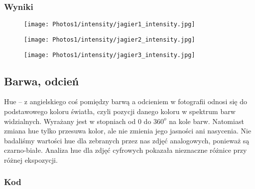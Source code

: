 \documentclass[]{mwart}
\begin{document}
\subsubsection{Wyniki}



\begin{figure}[H]
    \centering
    \texttt{[image: Photos1/intensity/jagier1\_intensity.jpg]}
\end{figure}
\begin{figure}[H]
    \centering
    \texttt{[image: Photos1/intensity/jagier2\_intensity.jpg]}
\end{figure}
\begin{figure}[H]
    \centering
    \texttt{[image: Photos1/intensity/jagier3\_intensity.jpg]}
\end{figure}




\newpage
\subsection{Barwa, odcień}
Hue -- z angielskiego coś pomiędzy barwą a odcieniem w fotografii odnosi się
do podstawowego koloru światła, czyli pozycji danego koloru w spektrum barw
widzialnych. Wyrażany jest w stopniach od $0$ do $360^o$ na kole
barw. Natomiast zmiana hue tylko przesuwa kolor, ale nie zmienia jego jasności
ani nasycenia. Nie badaliśmy wartości hue dla zebranych przez nas zdjęć analogowych,
ponieważ są czarno-białe. Analiza hue dla zdjęć cyfrowych pokazała nieznaczne różnice przy różnej ekspozycji.
\subsubsection{Kod}
\end{document}

